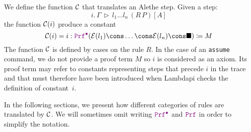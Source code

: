 \begin{definition}
We define the function $\cal{C}$ that translates an Alethe step. Given a step:
\[
  i. \, \Gamma \, \triangleright\, l_1 \dots l_n\,(R\,P)[A]
\]
the function $\cal{C}(i)$ produce a constant
\[
  \cal{C}(i) = i: \pid (\E{l_1}\cons\dots\cons\E{l_n}\cons \nil) \coloneq M
\]
The function $\cal{C}$ is defined by cases on the rule $R$.
In the case of an \texttt{assume} command, we do not provide a proof term $M$ so $i$ is considered as an axiom.
Its proof term may refer to constants representing steps that precede $i$ in the trace and that must therefore have been introduced when Lambdapi checks the definition of constant~$i$.
\label{def:function-c}
\end{definition}

In the following sections, we present how different categories of rules are translated by $\cal{C}$. We will sometimes omit writing $\pid$ and $\prf$ in order to simplify the notation.